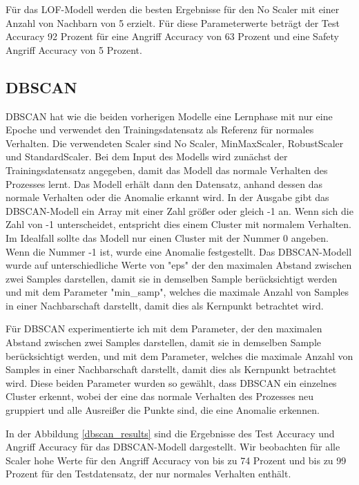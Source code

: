 \documentclass[12pt,a4paper]{scrartcl}
\numberwithin{equation}{section}
\begin{document}
Für das LOF-Modell werden die besten Ergebnisse für den No Scaler mit einer Anzahl von Nachbarn von 5 erzielt. Für diese Parameterwerte beträgt der Test Accuracy 92 Prozent für eine Angriff Accuracy von 63 Prozent und eine Safety Angriff Accuracy von 5 Prozent. 

\subsection{DBSCAN}

DBSCAN hat wie die beiden vorherigen Modelle eine Lernphase mit nur eine Epoche und verwendet den Trainingsdatensatz als Referenz für normales Verhalten. Die verwendeten Scaler sind No Scaler, MinMaxScaler, RobustScaler und StandardScaler. Bei dem Input des Modells wird zunächst der Trainingsdatensatz angegeben, damit das Modell das normale Verhalten des Prozesses lernt. Das Modell erhält dann den Datensatz, anhand dessen das normale Verhalten oder die Anomalie erkannt wird. In der Ausgabe gibt das DBSCAN-Modell ein Array mit einer Zahl größer oder gleich -1 an. Wenn sich die Zahl von -1 unterscheidet, entspricht dies einem Cluster mit normalem Verhalten. Im Idealfall sollte das Modell nur einen Cluster mit der Nummer 0 angeben. Wenn die Nummer -1 ist, wurde eine Anomalie festgestellt. Das DBSCAN-Modell wurde auf unterschiedliche Werte von "eps" der den maximalen Abstand zwischen zwei Samples darstellen, damit sie in demselben Sample berücksichtigt werden und mit dem Parameter "min\_samp", welches die maximale Anzahl von Samples in einer Nachbarschaft darstellt, damit dies als Kernpunkt betrachtet wird.

Für DBSCAN experimentierte ich mit dem Parameter, der den maximalen Abstand zwischen zwei Samples darstellen, damit sie in demselben Sample berücksichtigt werden, und mit dem Parameter, welches die maximale Anzahl von Samples in einer Nachbarschaft darstellt, damit dies als Kernpunkt betrachtet wird. Diese beiden Parameter wurden so gewählt, dass DBSCAN ein einzelnes Cluster erkennt, wobei der eine das normale Verhalten des Prozesses neu gruppiert und alle Ausreißer die Punkte sind, die eine Anomalie erkennen.

In der Abbildung \ref{dbscan_results} sind die Ergebnisse des Test Accuracy und Angriff Accuracy für das DBSCAN-Modell dargestellt. Wir beobachten für alle Scaler hohe Werte für den Angriff Accuracy von bis zu 74 Prozent und bis zu 99 Prozent für den Testdatensatz, der nur normales Verhalten enthält. 
\end{document}
